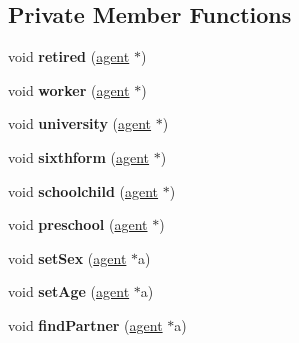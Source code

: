\subsection*{Private Member Functions}
\begin{DoxyCompactItemize}
\item 
\mbox{\label{classpopulationBuilder_a275a5768bd4eebcb6188a46c4f0938d3}} 
void {\bfseries retired} (\mbox{\hyperlink{classagent}{agent}} $\ast$)
\item 
\mbox{\label{classpopulationBuilder_a18fbed9af426b8063f58e60159a2d5e8}} 
void {\bfseries worker} (\mbox{\hyperlink{classagent}{agent}} $\ast$)
\item 
\mbox{\label{classpopulationBuilder_a3f2a99cff69c7003c5770ba970cfff71}} 
void {\bfseries university} (\mbox{\hyperlink{classagent}{agent}} $\ast$)
\item 
\mbox{\label{classpopulationBuilder_a0c30bc831b9eaeba7b2b58b950195eca}} 
void {\bfseries sixthform} (\mbox{\hyperlink{classagent}{agent}} $\ast$)
\item 
\mbox{\label{classpopulationBuilder_aa83d25930398df932ea6064ca9f9222c}} 
void {\bfseries schoolchild} (\mbox{\hyperlink{classagent}{agent}} $\ast$)
\item 
\mbox{\label{classpopulationBuilder_a520ae0408fc41a6c495db1f12a365410}} 
void {\bfseries preschool} (\mbox{\hyperlink{classagent}{agent}} $\ast$)
\item 
\mbox{\label{classpopulationBuilder_a0f15496718bade91156656ad422c1655}} 
void {\bfseries set\+Sex} (\mbox{\hyperlink{classagent}{agent}} $\ast$a)
\item 
\mbox{\label{classpopulationBuilder_a0f1780441694d2ba8f2a36d511b9ecf8}} 
void {\bfseries set\+Age} (\mbox{\hyperlink{classagent}{agent}} $\ast$a)
\item 
\mbox{\label{classpopulationBuilder_acbd753c13135d99eafb765e84766fc42}} 
void {\bfseries find\+Partner} (\mbox{\hyperlink{classagent}{agent}} $\ast$a)

\end{DoxyCompactItemize}
